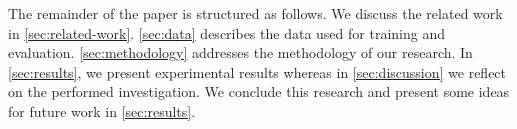 The remainder of the paper is structured as follows. We discuss the related work in \cref{sec:related-work}. \cref{sec:data} describes the data used for training and evaluation. \cref{sec:methodology} addresses the methodology of our research. In \cref{sec:results}, we present experimental results whereas in \cref{sec:discussion} we reflect on the performed investigation. We conclude this research and present some ideas for future work in \cref{sec:results}.